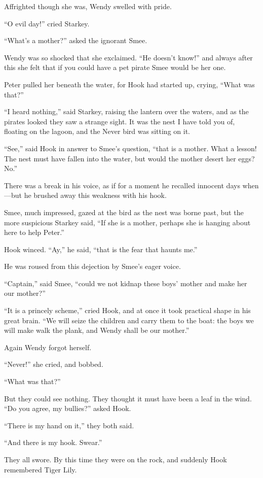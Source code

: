 Affrighted though she was, Wendy swelled with pride.

``O evil day!'' cried Starkey.

``What's a mother?'' asked the ignorant Smee.

Wendy was so shocked that she exclaimed. ``He doesn't know!'' and always
after this she felt that if you could have a pet pirate Smee would be
her one.

Peter pulled her beneath the water, for Hook had started up, crying,
``What was that?''

``I heard nothing,'' said Starkey, raising the lantern over the waters,
and as the pirates looked they saw a strange sight. It was the nest I
have told you of, floating on the lagoon, and the Never bird was
sitting on it.

``See,'' said Hook in answer to Smee's question, ``that is a mother. What
a lesson! The nest must have fallen into the water, but would the
mother desert her eggs? No.''

There was a break in his voice, as if for a moment he recalled innocent
days when—but he brushed away this weakness with his hook.

Smee, much impressed, gazed at the bird as the nest was borne past, but
the more suspicious Starkey said, ``If she is a mother, perhaps she is
hanging about here to help Peter.''

Hook winced. ``Ay,'' he said, ``that is the fear that haunts me.''

He was roused from this dejection by Smee's eager voice.

``Captain,'' said Smee, ``could we not kidnap these boys' mother and make
her our mother?''

``It is a princely scheme,'' cried Hook, and at once it took practical
shape in his great brain. ``We will seize the children and carry them to
the boat: the boys we will make walk the plank, and Wendy shall be our
mother.''

Again Wendy forgot herself.

``Never!'' she cried, and bobbed.

``What was that?''

But they could see nothing. They thought it must have been a leaf in
the wind. ``Do you agree, my bullies?'' asked Hook.

``There is my hand on it,'' they both said.

``And there is my hook. Swear.''

They all swore. By this time they were on the rock, and suddenly Hook
remembered Tiger Lily.

